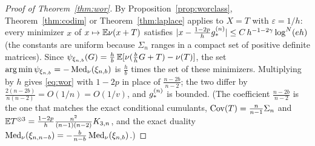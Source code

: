 \begin{proof}[Proof of Theorem~\ref{thm:wor}]
By Proposition~\ref{prop:worclass}, Theorem~\ref{thm:codim} or Theorem~\ref{thm:laplace} applies to $X=T$ with
$\varepsilon=1/h$: every minimizer $x$ of $x\mapsto\mathbb{E}\nu(x+T)$ satisfies
$|x-\frac{1-2p}hg_\ast^{(n)}|\le C\,h^{-1-2\gamma}\log^{N}(eh)$ (the constants are uniform because $\Sigma_n$ ranges in a
compact set of positive definite matrices). Since $\psi_{\xi_{n,b}}(G)=\frac hb\,\mathbb{E}[\nu(\frac bhG+T)-\nu(T)]$, the set
$\arg\min\psi_{\xi_{n,b}}=-\operatorname{Med}_\nu(\xi_{n,b})$ is $\frac hb$ times the set of these minimizers. Multiplying by $h$ gives
\eqref{eq:wor} with $1-2p$ in place of $\frac{n-2b}{n-2}$; the two differ by $\frac{2(n-2b)}{n(n-2)}=O(1/n)=O(1/v)$, and
$g_\ast^{(n)}$ is bounded. (The coefficient $\frac{n-2b}{n-2}$ is the one that matches the exact conditional cumulants,
$\operatorname{Cov}(T)=\frac n{n-1}\Sigma_n$ and $\mathbb{E} T^{\otimes3}=\frac{1-2p}{h}\frac{n^2}{(n-1)(n-2)}K_{3,n}$, and the exact duality
$\operatorname{Med}_\nu(\xi_{n,n-b})=-\frac b{n-b}\operatorname{Med}_\nu(\xi_{n,b})$.)
\end{proof}
